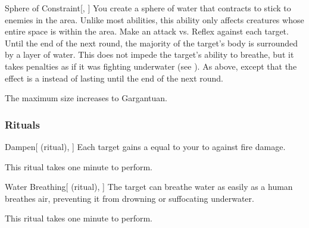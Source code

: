 \lowercase{\hypertarget{spell:Sphere of Constraint}{}}\label{spell:Sphere of Constraint}
\begin{freeability}[Rank 5]{\hypertarget{spell:Sphere of Constraint}{Sphere of Constraint}}[, ]
You create a sphere of water that contracts to stick to enemies in the area.
Unlike most abilities, this ability only affects creatures whose entire space is within the area.
Make an attack vs. Reflex against each target.
\hit Until the end of the next round, the majority of the target's body is surrounded by a layer of water.
This does not impede the target's ability to breathe, but it takes penalties as if it was fighting underwater (see ).
\crit As above, except that the effect is a  instead of lasting until the end of the next round.

\rankline
{} The maximum size increases to Gargantuan.
\end{freeability}
\vspace{0.25em}



\subsubsection{Rituals}


\lowercase{\hypertarget{spell:Dampen}{}}\label{spell:Dampen}
\begin{attuneability}[Rank 1]{\hypertarget{spell:Dampen}{Dampen}}[ (ritual), ]
Each target gains a  equal to your  to  against fire damage.

This ritual takes one minute to perform.
\end{attuneability}
\vspace{0.25em}



\lowercase{\hypertarget{spell:Water Breathing}{}}\label{spell:Water Breathing}
\begin{attuneability}[Rank 3]{\hypertarget{spell:Water Breathing}{Water Breathing}}[ (ritual), ]
The target can breathe water as easily as a human breathes air, preventing it from drowning or suffocating underwater.

This ritual takes one minute to perform.
\end{attuneability}
\vspace{0.25em}


